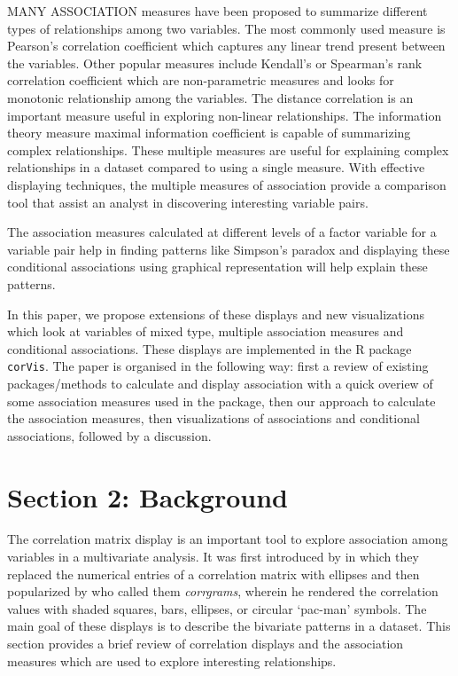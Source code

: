 MANY ASSOCIATION measures have been proposed to summarize different
types of relationships among two variables. The most commonly used
measure is Pearson's correlation coefficient which captures any linear
trend present between the variables. Other popular measures include
Kendall's or Spearman's rank correlation coefficient which are
non-parametric measures and looks for monotonic relationship among the
variables. The distance correlation \citep{szekely2007measuring} is an
important measure useful in exploring non-linear relationships. The
information theory measure maximal information coefficient
\citep{reshef2011detecting} is capable of summarizing complex
relationships. These multiple measures are useful for explaining complex
relationships in a dataset compared to using a single measure. With
effective displaying techniques, the multiple measures of association
provide a comparison tool that assist an analyst in discovering
interesting variable pairs.

The association measures calculated at different levels of a factor
variable for a variable pair help in finding patterns like Simpson's
paradox and displaying these conditional associations using graphical
representation will help explain these patterns.

In this paper, we propose extensions of these displays and new
visualizations which look at variables of mixed type, multiple
association measures and conditional associations. These displays are
implemented in the R package \texttt{corVis}. The paper is organised in
the following way: first a review of existing packages/methods to
calculate and display association with a quick overiew of some
association measures used in the package, then our approach to calculate
the association measures, then visualizations of associations and
conditional associations, followed by a discussion.

\hypertarget{section-2-background}{%
\section{Section 2: Background}\label{section-2-background}}

The correlation matrix display is an important tool to explore
association among variables in a multivariate analysis. It was first
introduced by \citet{murdoch1996graphical} in which they replaced the
numerical entries of a correlation matrix with ellipses and then
popularized by \citep{friendly2002corrgrams} who called them
\emph{corrgrams}, wherein he rendered the correlation values with shaded
squares, bars, ellipses, or circular `pac-man' symbols. The main goal of
these displays is to describe the bivariate patterns in a dataset. This
section provides a brief review of correlation displays and the
association measures which are used to explore interesting
relationships.

